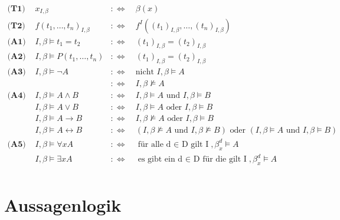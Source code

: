 \documentclass{article}
\begin{document}
			\begin{align*}
				\textbf{(T1) } & x_{I, \beta} & :\Leftrightarrow\ & \beta(x)\\
				\textbf{(T2) } & f(t_1, \ldots, t_n)_{I, \beta} &:\Leftrightarrow\ &  f^I((t_1)_{I, \beta}, \ldots, (t_n)_{I, \beta})\\
				\textbf{(A1) } & I, \beta \models t_1 = t_2 &:\Leftrightarrow\ &  (t_1)_{I, \beta} = (t_2)_{I, \beta}\\
				\textbf{(A2) } & I, \beta \models P(t_1, \ldots, t_n) &:\Leftrightarrow\ &  (t_1)_{I, \beta} = (t_2)_{I, \beta}\\
				\textbf{(A3) } & I, \beta \models \neg A &:\Leftrightarrow\ & \text{nicht } I, \beta \models A \\
				& & :\Leftrightarrow\ &  I, \beta \not\models A\\
				\textbf{(A4) } & I, \beta \models A \wedge B &:\Leftrightarrow\ &  I, \beta \models A \text{ und } I, \beta \models B\\
				& I, \beta \models A \vee B & :\Leftrightarrow\ & I, \beta \models A \text{ oder } I, \beta \models B\\
				& I, \beta \models A \rightarrow B & :\Leftrightarrow\ & I, \beta \not\models A \text{ oder } I, \beta \models B\\
				& I, \beta \models A \leftrightarrow B & :\Leftrightarrow\ & (I, \beta \not\models A \text{ und } I, \beta \not\models B) \text{ oder } (I, \beta \models A \text{ und } I, \beta \models B)\\
				\textbf{(A5) } & I, \beta \models \forall x A & :\Leftrightarrow\ & \text{f\"ur alle d $\in$ D gilt I}, \beta^{d}_{x} \models A\\
				& I, \beta \models \exists xA & :\Leftrightarrow\ & \text{es gibt ein d $\in$ D f\"ur die gilt I}, \beta^{d}_{x} \models A\\
			\end{align*}
	\section{Aussagenlogik}
\end{document}
